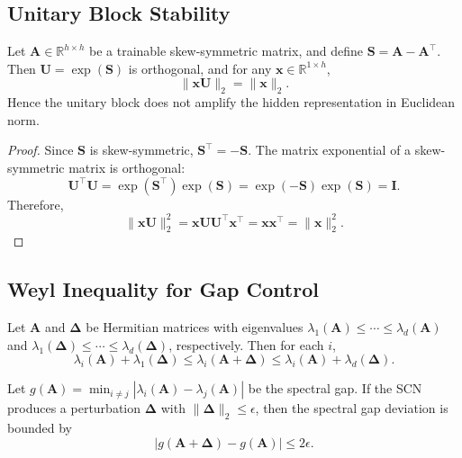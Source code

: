 \documentclass[11pt]{article}
\begin{document}
\subsection{Unitary Block Stability}

\begin{lemma}
Let $\mathbf{A} \in \mathbb{R}^{h \times h}$ be a trainable skew-symmetric matrix, and define $\mathbf{S} = \mathbf{A} - \mathbf{A}^\top$. Then $\mathbf{U} = \exp(\mathbf{S})$ is orthogonal, and for any $\mathbf{x} \in \mathbb{R}^{1 \times h}$,
\[
\|\mathbf{x}\mathbf{U}\|_2 = \|\mathbf{x}\|_2.
\]
Hence the unitary block does not amplify the hidden representation in Euclidean norm.
\end{lemma}

\begin{proof}
Since $\mathbf{S}$ is skew-symmetric, $\mathbf{S}^\top = -\mathbf{S}$. The matrix exponential of a skew-symmetric matrix is orthogonal:
\[
\mathbf{U}^\top \mathbf{U} = \exp(\mathbf{S}^\top)\exp(\mathbf{S}) = \exp(-\mathbf{S})\exp(\mathbf{S}) = \mathbf{I}.
\]
Therefore,
\[
\|\mathbf{x}\mathbf{U}\|_2^2 = \mathbf{x}\mathbf{U}\mathbf{U}^\top\mathbf{x}^\top = \mathbf{x}\mathbf{x}^\top = \|\mathbf{x}\|_2^2.
\]
\end{proof}

\subsection{Weyl Inequality for Gap Control}

\begin{theorem}
Let $\mathbf{A}$ and $\boldsymbol{\Delta}$ be Hermitian matrices with eigenvalues $\lambda_1(\mathbf{A}) \leq \cdots \leq \lambda_d(\mathbf{A})$ and $\lambda_1(\boldsymbol{\Delta}) \leq \cdots \leq \lambda_d(\boldsymbol{\Delta})$, respectively. Then for each $i$,
\[
\lambda_i(\mathbf{A}) + \lambda_1(\boldsymbol{\Delta}) \leq \lambda_i(\mathbf{A} + \boldsymbol{\Delta}) \leq \lambda_i(\mathbf{A}) + \lambda_d(\boldsymbol{\Delta}).
\]
\end{theorem}

\begin{corollary}
Let $g(\mathbf{A}) = \min_{i \neq j} |\lambda_i(\mathbf{A}) - \lambda_j(\mathbf{A})|$ be the spectral gap. If the SCN produces a perturbation $\boldsymbol{\Delta}$ with $\|\boldsymbol{\Delta}\|_2 \leq \epsilon$, then the spectral gap deviation is bounded by
\[
|g(\mathbf{A} + \boldsymbol{\Delta}) - g(\mathbf{A})| \leq 2\epsilon.
\]
\end{corollary}
\end{document}
